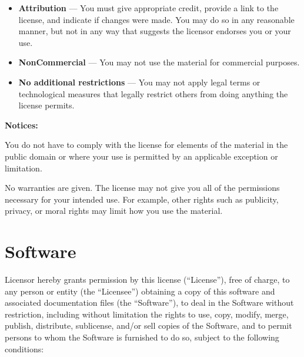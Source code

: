 \documentclass[krantzl]{krantz}
\begin{document}
\begin{itemize}
\item 

\textbf{Attribution} — You must give appropriate credit, provide a link to the
    license, and indicate if changes were made. You may do so in any reasonable
    manner, but not in any way that suggests the licensor endorses you or your
    use.



\item 

\textbf{NonCommercial} — You may not use the material for commercial purposes.



\item 

\textbf{No additional restrictions} — You may not apply legal terms or technological
    measures that legally restrict others from doing anything the license
    permits.



\end{itemize}

\textbf{Notices:}


You do not have to comply with the license for elements of the material in the
public domain or where your use is permitted by an applicable exception or
limitation.


No warranties are given. The license may not give you all of the permissions
necessary for your intended use. For example, other rights such as publicity,
privacy, or moral rights may limit how you use the material.

\section{Software}

Licensor hereby grants permission by this license (“License”), free of charge,
to any person or entity (the “Licensee”) obtaining a copy of this software and
associated documentation files (the “Software”), to deal in the Software without
restriction, including without limitation the rights to use, copy, modify,
merge, publish, distribute, sublicense, and/or sell copies of the Software, and
to permit persons to whom the Software is furnished to do so, subject to the
following conditions:
\end{document}
